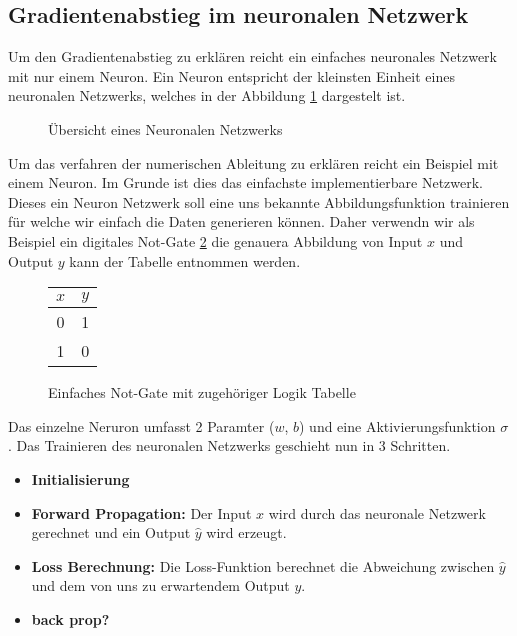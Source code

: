 \subsection{Gradientenabstieg im neuronalen Netzwerk}
Um den Gradientenabstieg zu erklären reicht ein einfaches neuronales Netzwerk mit nur einem Neuron.
Ein Neuron entspricht der kleinsten Einheit eines neuronalen Netzwerks, welches in der Abbildung \ref{ableitung:fig:neuronal_network} dargestelt ist.
\begin{figure}
	\begin{center}
		
		\caption{Übersicht eines Neuronalen Netzwerks}
		\label{ableitung:fig:neuronal_network}
	\end{center}
\end{figure}
Um das verfahren der numerischen Ableitung zu erklären reicht ein Beispiel mit einem Neuron.
Im Grunde ist dies das einfachste implementierbare Netzwerk.
Dieses ein Neuron Netzwerk soll eine uns bekannte Abbildungsfunktion trainieren für welche wir einfach die Daten generieren können.
Daher verwendn wir als Beispiel ein digitales Not-Gate \ref{ableitung:fig:not_gate} die genauera Abbildung von Input $x$ und Output $y$ kann der Tabelle entnommen werden.
\begin{figure}
	\begin{center}

		\begin{tabular}{cc}
			\hline
			$x$ & $y$ \\
			\hline
			0 & 1 \\ 
			1 & 0 \\ 
			\hline
			
		\end{tabular}

		\caption{Einfaches Not-Gate mit zugehöriger Logik Tabelle}
		\label{ableitung:fig:not_gate}
	\end{center}
\end{figure}

Das einzelne Neruron umfasst 2 Paramter ($w$, $b$) und eine Aktivierungsfunktion $\sigma$. Das Trainieren des neuronalen Netzwerks geschieht nun in 3 Schritten.
\begin{itemize}
	\item \textbf{Initialisierung}
	\item \textbf{Forward Propagation:} Der Input $x$ wird durch das neuronale Netzwerk gerechnet und ein Output $\hat{y}$ wird erzeugt.
	\item \textbf{Loss Berechnung:} Die Loss-Funktion berechnet die Abweichung zwischen $\hat{y}$ und dem von uns zu erwartendem Output $y$.
	\item \textbf{back prop?}
\end{itemize}

